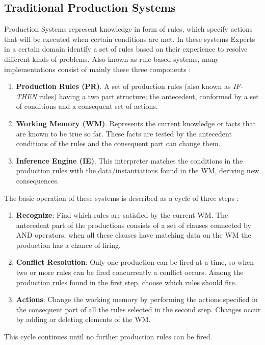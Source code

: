 \subsection{Traditional Production Systems}
Production Systems represent knowledge in form of rules, which specify
actions that will be executed when certain conditions are met. In these 
systems Experts in a certain domain identify a set of rules based 
on their experience to
resolve different kinds of problems. Also known as rule based systems,
many implementations consist of mainly these three
components \cite{brachman1992knowledge} \cite{konar2006computational}:
\begin{enumerate}   
\item \textbf{Production Rules (PR)}. A set of
production rules (also known as \textit{IF-THEN} rules) having a two part
structure; the antecedent, conformed by a set of conditions and a
consequent set of actions. 
\item \textbf{Working Memory (WM)}.
Represents the current knowledge or facts that are known to be true so
far. These facts are tested by the antecedent conditions of the rules
and the consequent part can change them. 
\item \textbf{Inference Engine (IE)}. 
This interpreter matches the conditions in the
production rules with the data/instantiations found in the WM,
deriving new consequences.
\end{enumerate}
The basic operation of these systems is described as a cycle of 
three steps \cite{brachman1992knowledge}:
\begin{enumerate}
\item \textbf{Recognize}: Find which rules are satisfied by 
the current WM. The antecedent part of the productions consists 
of a set of clauses connected by AND operators, when all these 
clauses have matching data on the WM the production has a chance 
of firing.
\item \textbf{Conflict Resolution}: Only one production can be 
fired at a time, so when two or more rules can be fired concurrently 
a conflict occurs. Among the production rules found in the first 
step, choose which rules should fire.
\item \textbf{Actions}: Change the working memory by performing 
the actions specified in the consequent part of all the rules 
selected in the second step. Changes occur by adding or 
deleting elements of the WM.
\end{enumerate}
This cycle continues until no further production rules can be fired.
